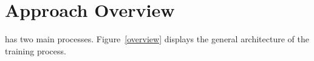 \section{Approach Overview}
\label{overview:sec}

{\tool} has two main processes. Figure~\ref{overview} displays the
general architecture of the training process.
